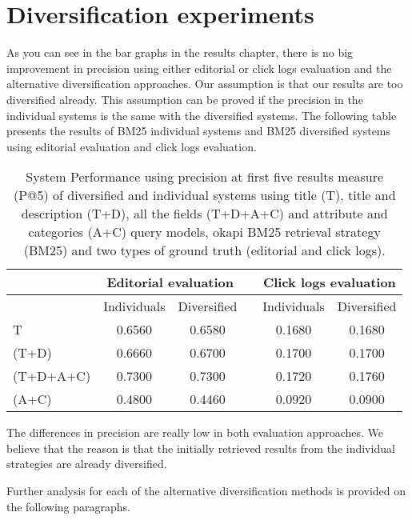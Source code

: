 \section{Diversification experiments}

As you can see in the bar graphs in the results chapter, there is no big improvement in precision using either editorial or click logs evaluation and the alternative diversification approaches. Our assumption is that our results are too diversified already. This assumption can be proved if the precision in the individual systems is the same with the diversified systems. The following table presents the results of BM25 individual systems and BM25 diversified systems using editorial evaluation and click logs evaluation.



\begin{table}[H]
\footnotesize
\begin{center}
\caption{System Performance using precision at first five results measure (P@5) of diversified and individual systems using title (T), title and description (T+D), all the fields (T+D+A+C) and attribute and categories (A+C) query models, okapi BM25 retrieval strategy (BM25) and two types of ground truth (editorial and click logs).
}

\begin{tabular}{lccccc}
\toprule
 & \multicolumn{2}{c}{Editorial evaluation} &   & \multicolumn{2}{c}{Click logs evaluation} \\
\midrule
 & Individuals & Diversified &   & Individuals & Diversified \\
\midrule
T & 0.6560 & 0.6580 &   & 0.1680 & 0.1680 \\
(T+D) & 0.6660 & 0.6700 &   & 0.1700 & 0.1700 \\
(T+D+A+C) & 0.7300 & 0.7300 &   & 0.1720 & 0.1760 \\
(A+C) & 0.4800 & 0.4460 &   & 0.0920 & 0.0900 \\
\bottomrule
\end{tabular}
\end{center}
\end{table}


The differences in precision are really low in both evaluation approaches. We believe that the reason is that the initially retrieved results from the individual strategies are already diversified.

Further analysis for each of the alternative diversification methods is provided on the following paragraphs.

